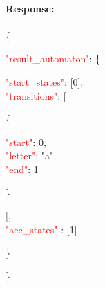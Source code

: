 \ \\
\textbf{Response:}\\
\ \\
 \{
 \begin{adjustwidth}{7.5 mm}{0 cm}
    \textcolor{red}{"result\_automaton"}: \{
        \begin{adjustwidth}{7.5 mm}{0 cm}
            \textcolor{red}{"start\_states"}: [0],\\
            \textcolor{red}{"transitions"}: [
            \begin{adjustwidth}{7.5 mm}{0 cm}
            \{
               \begin{adjustwidth}{7.5 mm}{0 cm}
                    \textcolor{red}{"start"}: 0,\\
                    \textcolor{red}{"letter"}: "a",\\
                    \textcolor{red}{"end"}: 1
               \end{adjustwidth}
            \}
            \end{adjustwidth}
            ],\\
        \textcolor{red}{"acc\_states" }: [1]
    \end{adjustwidth}
    \}
\end{adjustwidth}
\}






